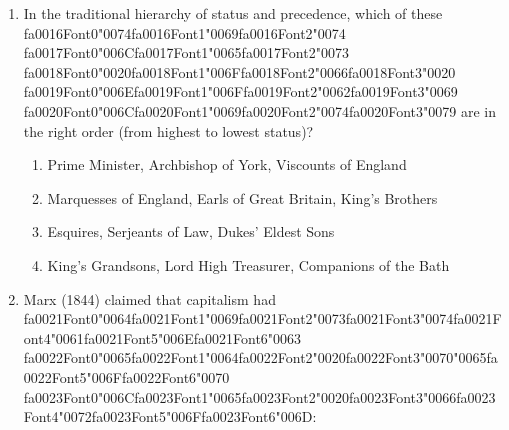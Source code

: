 \documentclass[12pt]{article}
\begin{document}
\begin{enumerate}[label=\arabic*.]
\begin{enumerate}[label=(\alph*)]
    \item the group of structural theories of society that he was reacting against
    \item the overall impression of ourselves that we try to give off to others
    \item a significant figure in early childhood who teaches us the general values of society
    \item an image of how people in the wider society might perceive our behaviour
\end{enumerate}
\item In the traditional hierarchy of status and precedence, which of these {\csname fa0016Font0\endcsname\char"0074}{\csname fa0016Font1\endcsname\char"0069}{\csname fa0016Font2\endcsname\char"0074} {\csname fa0017Font0\endcsname\char"006C}{\csname fa0017Font1\endcsname\char"0065}{\csname fa0017Font2\endcsname\char"0073} {\csname fa0018Font0\endcsname\char"0020}{\csname fa0018Font1\endcsname\char"006F}{\csname fa0018Font2\endcsname\char"0066}{\csname fa0018Font3\endcsname\char"0020} {\csname fa0019Font0\endcsname\char"006E}{\csname fa0019Font1\endcsname\char"006F}{\csname fa0019Font2\endcsname\char"0062}{\csname fa0019Font3\endcsname\char"0069} {\csname fa0020Font0\endcsname\char"006C}{\csname fa0020Font1\endcsname\char"0069}{\csname fa0020Font2\endcsname\char"0074}{\csname fa0020Font3\endcsname\char"0079} are in the right order (from highest to lowest status)?
\begin{enumerate}[label=(\alph*)]
    \item Prime Minister, Archbishop of York, Viscounts of England
    \item Marquesses of England, Earls of Great Britain, King's Brothers
    \item Esquires, Serjeants of Law, Dukes' Eldest Sons
    \item King's Grandsons, Lord High Treasurer, Companions of the Bath
\end{enumerate}
\item Marx (1844) claimed that capitalism had {\csname fa0021Font0\endcsname\char"0064}{\csname fa0021Font1\endcsname\char"0069}{\csname fa0021Font2\endcsname\char"0073}{\csname fa0021Font3\endcsname\char"0074}{\csname fa0021Font4\endcsname\char"0061}{\csname fa0021Font5\endcsname\char"006E}{\csname fa0021Font6\endcsname\char"0063} {\csname fa0022Font0\endcsname\char"0065}{\csname fa0022Font1\endcsname\char"0064}{\csname fa0022Font2\endcsname\char"0020}{\csname fa0022Font3\endcsname\char"0070}{\char"0065}{\csname fa0022Font5\endcsname\char"006F}{\csname fa0022Font6\endcsname\char"0070} {\csname fa0023Font0\endcsname\char"006C}{\csname fa0023Font1\endcsname\char"0065}{\csname fa0023Font2\endcsname\char"0020}{\csname fa0023Font3\endcsname\char"0066}{\csname fa0023Font4\endcsname\char"0072}{\csname fa0023Font5\endcsname\char"006F}{\csname fa0023Font6\endcsname\char"006D}:

\end{enumerate}
\end{document}
